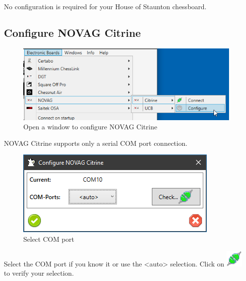 \documentclass[11pt,a4paper]{article}
\begin{document}
No configuration is required for your House of Staunton chessboard.\\ 


\subsection{Configure NOVAG Citrine} \label{ConfigureNovagCitrine}

\begin{figure}[H]
	\centering
	\includegraphics[scale=0.8]{NovagCitrine1.png}
	\caption{Open a window to configure NOVAG Citrine }
	\label{fig:NovagCtrine1}
\end{figure}

NOVAG Citrine supports only a serial COM port connection.

\begin{figure}[H]
	\centering
	\includegraphics[scale=1.0]{NovagCitrine2.png}
	\caption{Select COM port}
	\label{fig:NovagCtrine2}
\end{figure}

Select the COM port if you know it or use the <auto> selection. 
Click on \includegraphics[scale=0.5]{connect.png} to verify your selection.
\end{document}
